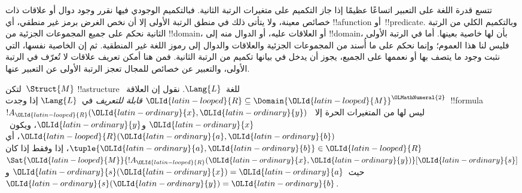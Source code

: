 \documentclass[../../../include/open-logic-section]{subfiles}
\begin{document}

\begin{explain}
تتسع قدرة اللغة على التعبير اتساعًا عظيمًا إذا جاز التكميم على متغيرات
الرتبة الثانية. فبالتكميم الوجودي فيها نقرر وجود دوال أو علاقات ذات
خصائص معينة، ولا يتأتى ذلك في منطق الرتبة الأولى إلا أن نخص الغرض
برمز غير منطقي، أي !!a{function} أو~!!{predicate}.
وبالتكميم الكلي من الرتبة الثانية نحكم على جميع المجموعات الجزئية من
!!{domain}، أو العلاقات عليه، أو الدوال منه إلى !!{domain}،
بأن لها خاصية بعينها. أما في الرتبة الأولى فليس لنا هذا العموم؛
وإنما نحكم على ما أُسند من المجموعات الجزئية والعلاقات والدوال إلى
رموز اللغة غير المنطقية. ثم إن الخاصية نفسها، التي نثبت وجود ما
يتصف بها أو نعممها على الجميع، يجوز أن يدخل في بيانها تكميم من
الرتبة الثانية. فمن هنا أمكن تعريف علاقات لا تُعرّف في الرتبة الأولى،
والتعبير عن خصائص للمجال تعجز الرتبة الأولى عن التعبير عنها.
\end{explain}

\begin{defn}
لتكن~$\Struct{M}$ !!a{structure} للغة~$\Lang{L}$.
نقول إن العلاقة~$\OLId{latin-looped}{R} \subseteq \Domain{\OLId{latin-looped}{M}}^\OLMathNumeral{2}$ \emph{قابلة للتعريف}
في~$\Lang{L}$ إذا وجدت~!!{formula}~$!A_\OLId{latin-looped}{R}(\OLId{latin-ordinary}{x}, \OLId{latin-ordinary}{y})$ ليس لها من
المتغيرات الحرة إلا~$\OLId{latin-ordinary}{x}$ و$\OLId{latin-ordinary}{y}$، ويكون~$\OLId{latin-looped}{R}(\OLId{latin-ordinary}{a}, \OLId{latin-ordinary}{b})$، أي
$\tuple{\OLId{latin-ordinary}{a},\OLId{latin-ordinary}{b}} \in \OLId{latin-looped}{R}$، إذا وفقط إذا كان
$\Sat{\OLId{latin-looped}{M}}{!A_\OLId{latin-looped}{R}(\OLId{latin-ordinary}{x}, \OLId{latin-ordinary}{y})}[\OLId{latin-ordinary}{s}]$ حيث~$\OLId{latin-ordinary}{s}(\OLId{latin-ordinary}{x}) = \OLId{latin-ordinary}{a}$ و$\OLId{latin-ordinary}{s}(\OLId{latin-ordinary}{y}) = \OLId{latin-ordinary}{b}$.
\end{defn}
\end{document}
